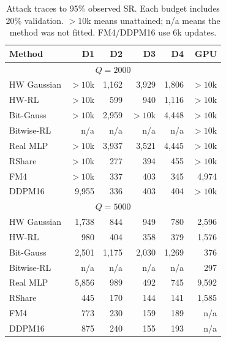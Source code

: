 \begin{table}[t]
\centering\small
\caption{Attack traces to 95\% observed SR. Each budget includes 20\% validation. $>10$k means unattained; n/a means the method was not fitted. FM4/DDPM16 use 6k updates.}
\label{tab:attack-requirements}
\setlength{\tabcolsep}{2pt}\renewcommand{\arraystretch}{1.06}
\begin{tabular*}{\columnwidth}{@{\extracolsep{\fill}}lrrrrr@{}}
\toprule
Method & D1 & D2 & D3 & D4 & GPU\\
\midrule
\multicolumn{6}{c}{$Q=2000$}\\
HW Gaussian & $>10$k & 1,162 & 3,929 & 1,806 & $>10$k\\
HW-RL & $>10$k & 599 & 940 & 1,116 & $>10$k\\
Bit-Gauss & $>10$k & 2,959 & $>10$k & 4,448 & $>10$k\\
Bitwise-RL & n/a & n/a & n/a & n/a & $>10$k\\
Real MLP & $>10$k & 3,937 & 3,521 & 4,445 & $>10$k\\
RShare & $>10$k & 277 & 394 & 455 & $>10$k\\
FM4 & $>10$k & 337 & 403 & 345 & 4,974\\
DDPM16 & 9,955 & 336 & 403 & 404 & $>10$k\\
\midrule
\multicolumn{6}{c}{$Q=5000$}\\
HW Gaussian & 1,738 & 844 & 949 & 780 & 2,596\\
HW-RL & 980 & 404 & 358 & 379 & 1,576\\
Bit-Gauss & 2,501 & 1,175 & 2,030 & 1,269 & 376\\
Bitwise-RL & n/a & n/a & n/a & n/a & 297\\
Real MLP & 5,856 & 989 & 492 & 745 & 9,592\\
RShare & 445 & 170 & 144 & 141 & 1,585\\
FM4 & 773 & 230 & 159 & 189 & n/a\\
DDPM16 & 875 & 240 & 155 & 193 & n/a\\
\bottomrule
\end{tabular*}
\end{table}
